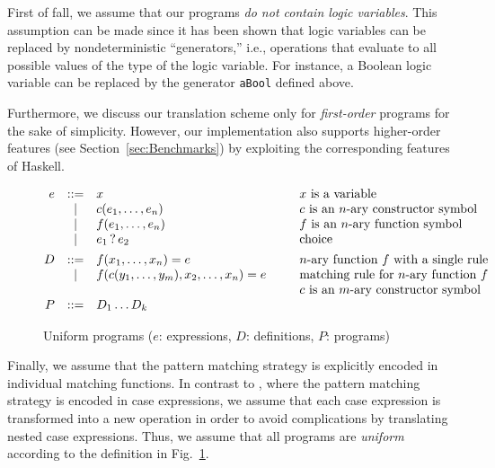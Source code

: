 \documentclass{llncs}
\newcommand{\code}[1]{\mbox{\small\texttt{#1}}}
\newcommand{\Choice}[2]{#1 \mathop{?} #2}
\begin{document}
\label{sec:no-logic-vars}
First of fall, we assume that our programs
\emph{do not contain logic variables}.
This assumption can be made since it has been shown
\cite{AntoyHanus06ICLP} that logic variables can be replaced
by nondeterministic ``generators,''
i.e., operations that evaluate to all possible values of the type of
the logic variable. For instance, a Boolean logic variable
can be replaced by the generator \code{aBool} defined above.

Furthermore, we discuss our translation scheme only for \emph{first-order}
programs for the sake of simplicity.
However, our implementation also supports higher-order features
(see Section~\ref{sec:Benchmarks}) by exploiting the corresponding
features of Haskell.

\begin{figure}[t]
\[
\begin{array}{@{}rcl@{~~~~~~~~}l}
  e & ::= & x & \mbox{$x$ is a variable}\\
    &  |  & c(e_1,\ldots,e_n) & \mbox{$c$ is an $n$-ary constructor symbol}\\
    &  |  & f(e_1,\ldots,e_n) & \mbox{$f$ is an $n$-ary function symbol}\\
    &  |  & \Choice{e_1}{e_2} & \mbox{choice} \\[1ex]
  D & ::= & f(x_1,\ldots,x_n) = e
                & \mbox{$n$-ary function $f$ with a single rule}\\
    &  |  & f(c(y_1,\ldots,y_m),x_2,\ldots,x_n) = e
                & \mbox{matching rule for $n$-ary function $f$}\\
    &     & & \mbox{$c$ is an $m$-ary constructor symbol}\\
  P & ::= & D_1 \ldots D_k
\end{array}
\]
\caption{Uniform programs ($e$: expressions, $D$: definitions, $P$: programs)}
\label{fig:uniform}
\end{figure}
%
Finally, we assume that the pattern matching strategy
is explicitly encoded in individual matching functions.
In contrast to \cite{AlbertHanusHuchOliverVidal05},
where the pattern matching strategy is encoded in case expressions,
we assume that each case expression is transformed into
a new operation in order to avoid complications by translating
nested case expressions.
Thus, we assume that all programs are \emph{uniform}
according to the definition in Fig.~\ref{fig:uniform}.
\end{document}
